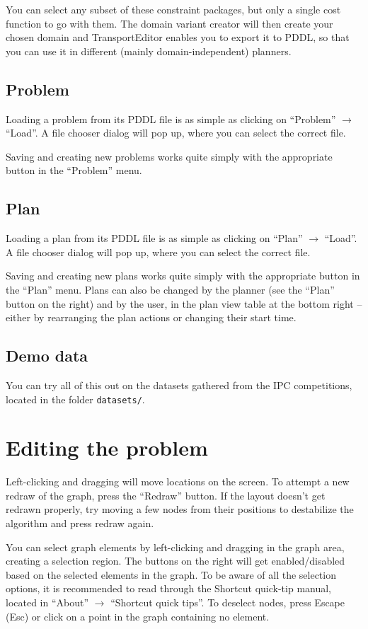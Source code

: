 \documentclass[12pt,a4paper,twoside]{article}
\begin{document}
You can select any subset of these constraint packages, but only a single cost function to go with them.
The domain variant creator will then create your chosen domain and TransportEditor enables you to export it to PDDL,
so that you can use it in different (mainly domain-independent) planners.

\subsection{Problem}
Loading a problem from its PDDL file is as simple as clicking on ``Problem'' $\to$ ``Load''.
A file chooser dialog will pop up, where you can select the correct file.

Saving and creating new problems works quite simply with the appropriate button in the ``Problem'' menu.

\subsection{Plan}
Loading a plan from its PDDL file is as simple as clicking on ``Plan'' $\to$ ``Load''.
A file chooser dialog will pop up, where you can select the correct file.

Saving and creating new plans works quite simply with the appropriate button in the ``Plan'' menu.
Plans can also be changed by the planner (see the ``Plan'' button on the right) and by the user, in the plan view
table at the bottom right -- either by rearranging the plan actions or changing their start time.

\subsection{Demo data}
You can try all of this out on the datasets gathered from the IPC competitions, located in the folder \texttt{datasets/}.

\section{Editing the problem}
Left-clicking and dragging will move locations on the screen. To attempt a new redraw of the graph,
press the ``Redraw'' button. If the layout doesn't get redrawn properly, try moving a few nodes from their
positions to destabilize the algorithm and press redraw again.

You can select graph elements by left-clicking and dragging in the graph area, creating a selection region.
The buttons on the right will get enabled/disabled based on the selected elements in the graph.
To be aware of all the selection options, it is recommended to read through the
Shortcut quick-tip manual, located in ``About'' $\to$ ``Shortcut quick tips''. To deselect nodes,
press Escape (Esc) or click on a point in the graph containing no element.
\end{document}
